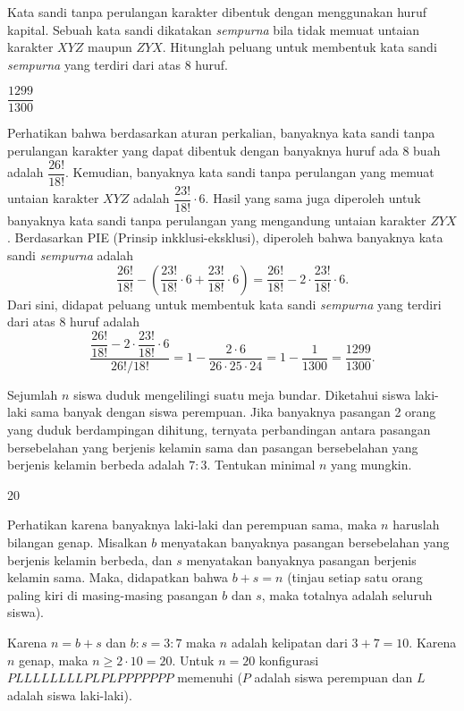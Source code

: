 \documentclass[12pt]{scrartcl}
\begin{document}
	\begin{soalbaru}
		Kata sandi tanpa perulangan karakter dibentuk dengan menggunakan huruf kapital. Sebuah kata sandi dikatakan \textit{sempurna} bila tidak memuat untaian karakter $XYZ$ maupun $ZYX$. Hitunglah peluang untuk membentuk kata sandi \textit{sempurna} yang terdiri dari atas 8 huruf.
		
		\begin{jawaban}
		$\dfrac{1299}{1300}$
		\end{jawaban}
		\begin{solusi}
		Perhatikan bahwa berdasarkan aturan perkalian, banyaknya kata sandi tanpa perulangan karakter yang dapat dibentuk dengan banyaknya huruf ada 8 buah adalah $\dfrac{26!}{18!}$. Kemudian, banyaknya kata sandi tanpa perulangan yang memuat untaian karakter $XYZ$ adalah $\dfrac{23!}{18!}\cdot 6$. Hasil yang sama juga diperoleh untuk banyaknya kata sandi tanpa perulangan yang mengandung untaian karakter $ZYX$. Berdasarkan PIE (Prinsip inkklusi-eksklusi), diperoleh bahwa banyaknya kata sandi \textit{sempurna} adalah $$\dfrac{26!}{18!}-\left( \dfrac{23!}{18!}\cdot 6 +  \dfrac{23!}{18!}\cdot 6 \right)=\dfrac{26!}{18!}-2 \cdot \dfrac{23!}{18!} \cdot 6.$$ Dari sini, didapat peluang untuk membentuk kata sandi \textit{sempurna} yang terdiri dari atas 8 huruf adalah $$\dfrac{\dfrac{26!}{18!}-2 \cdot \dfrac{23!}{18!} \cdot 6}{26!/18!}=1-\dfrac{2\cdot 6}{26 \cdot 25 \cdot 24}= 1 - \dfrac{1}{1300}=\dfrac{1299}{1300}.$$
		\end{solusi}
	\end{soalbaru}
	
	\begin{soalbaru}
			Sejumlah $n$ siswa duduk mengelilingi suatu meja bundar. Diketahui siswa laki-laki sama banyak dengan siswa perempuan. Jika banyaknya pasangan 2 orang yang duduk berdampingan
			dihitung, ternyata perbandingan antara pasangan bersebelahan yang berjenis kelamin sama dan
			pasangan bersebelahan yang berjenis kelamin berbeda adalah $7 : 3$. Tentukan minimal $n$ yang mungkin.
			
			\begin{jawaban}
					20
					\end{jawaban}
					\begin{solusi}Perhatikan karena banyaknya laki-laki dan perempuan sama, maka $n$ haruslah bilangan genap.
					Misalkan $b$ menyatakan banyaknya pasangan bersebelahan yang berjenis kelamin berbeda, dan $s$ menyatakan banyaknya pasangan berjenis kelamin sama. Maka, didapatkan bahwa $b+s=n$ (tinjau setiap satu orang paling kiri di masing-masing pasangan $b$ dan $s$, maka totalnya adalah seluruh siswa).
					
					Karena $n=b+s$ dan $b:s=3:7$ maka $n$ adalah kelipatan dari $3+7=10$. Karena $n$ genap, maka $n \ge 2 \cdot 10 = 20$. Untuk $n=20$ konfigurasi $PLLLLLLLLPLPLPPPPPPP$ memenuhi ($P$ adalah siswa perempuan dan $L$ adalah siswa laki-laki).
					\end{solusi}
		\end{soalbaru}
			
\end{document}
